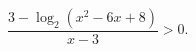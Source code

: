 \begin{ex}[type=inequality]
	\begin{condition}
		$ \dfrac{3 - \log_2(x^2 - 6x + 8)}{x - 3}>0 .$
	\end{condition}
\end{ex}